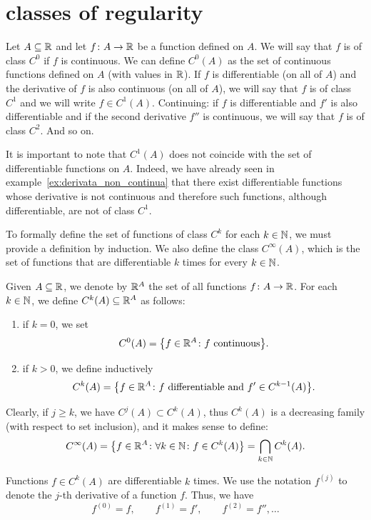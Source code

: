 \section{classes of regularity}

Let $A\subseteq {\mathbb R}$ and let $f\colon A\to {\mathbb R}$ be a function defined on $A$.
We will say that $f$ is of class $C^0$ if $f$ is continuous.
We can define $C^0(A)$ as the set of continuous functions defined on $A$ (with
values in ${\mathbb R}$).
If $f$ is differentiable (on all of $A$) and the derivative of $f$ is also
continuous (on all of $A$), we will say that $f$ is of class $C^1$ and we will
write $f\in C^1(A)$.
Continuing: if $f$ is differentiable and $f'$ is also differentiable and if the
second derivative $f''$ is continuous, we will say that $f$ is of class $C^2$.
And so on.

It is important to note that $C^1(A)$ does not coincide with the set of
differentiable functions on $A$.
Indeed, we have already seen in example~\ref{ex:derivata_non_continua} that
there exist differentiable functions whose derivative is not continuous and
therefore such functions, although differentiable, are not of class $C^1$.

To formally define the set of functions of class $C^k$ for each $k\in {\mathbb N}$, we
must provide a definition by induction.
We also define the class $C^{\infty}(A)$, which is the set of functions that are
differentiable $k$ times for every $k\in {\mathbb N}$.

\begin{definition}
\mymark{**}
Given $A\subseteq {\mathbb R}$, we denote by ${\mathbb R}^A$ the set of all functions $f\colon A
\to {\mathbb R}$.
For each $k\in {\mathbb N}$, we define $C^k(A) \subseteq {\mathbb R}^A$ as follows:
%
\begin{enumerate}
\item if $k=0$, we set
\[
  C^0(A) = {\left\{ f\in {\mathbb R}^A \colon \text{$f$ continuous} \right\}}.
\]
\item
  if $k>0$, we define inductively
  \[
    C^{k}(A) = {\left\{ f\in {\mathbb R}^A \colon \text{$f$ differentiable and $f'\in
  C^{k-1}(A)$} \right\}}.
  \]
\end{enumerate}
Clearly, if $j\ge k$, we have $C^j(A) \subset C^k(A)$, thus $C^k(A)$ is a
decreasing family (with respect to set inclusion), and it makes sense to define:
%
\[
    C^\infty(A) = {\left\{ f\in {\mathbb R}^A\colon \forall k \in {\mathbb N}\colon f\in C^k(A) \right\}}
  = \bigcap_{k\in {\mathbb N}} C^k(A).
\]

Functions $f\in C^k(A)$ are differentiable $k$ times.
We use the notation $f^{(j)}$%
%
 to denote the $j$-th derivative of a function $f$.
Thus, we have
\[
  f^{(0)} = f, \qquad
  f^{(1)} = f', \qquad
  f^{(2)} = f'', \dots
\]
\end{definition}

